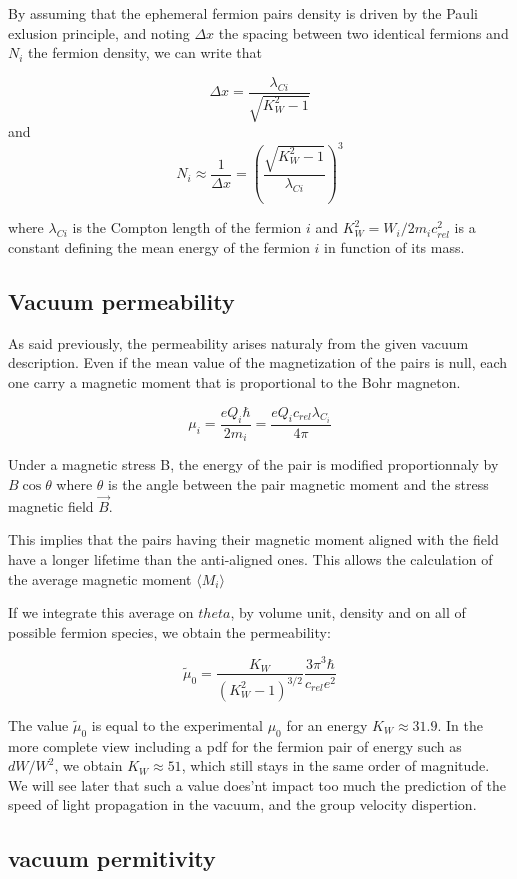 \documentclass[9pt, a4, twoside]{article}
\begin{document}
By assuming that the ephemeral fermion pairs density is driven by the Pauli exlusion principle, and noting $\Delta x$ the spacing between two identical fermions and $N_i$ the fermion density, we can write that

\[ \Delta x = \frac {\lambda _{Ci}} {\sqrt {K^2_W - 1}} \]
and
\[N_i \approx \frac {1} {\Delta x} = \left(\frac {\sqrt {K^2_W - 1}}{\lambda _{Ci}}\right)^3\]

where $\lambda _{Ci}$ is the Compton length of the fermion $i$ and $K^2_W = W_i / 2m_ic^2_{rel}$ is a constant defining the mean energy of the fermion $i$ in function of its mass.

\subsection {Vacuum permeability}
As said previously, the permeability arises naturaly from the given vacuum description. Even if the mean value of the magnetization of the pairs is null, each one carry a magnetic moment that is proportional to the Bohr magneton.

\[\mu_i = \frac {eQ_i\hbar} {2m_i} = \frac {eQ_ic_{rel}\lambda_{C_i}} {4\pi}\]

Under a magnetic stress B, the energy of the pair is modified proportionnaly by $B\cos\theta$ where $\theta$ is the angle between the pair magnetic moment and the stress magnetic field $\vec B$.

This implies that the pairs having their magnetic moment aligned with the field have a longer lifetime than the anti-aligned ones. This allows the calculation of the average magnetic moment $\langle M_i \rangle$

If we integrate this average on $theta$, by volume unit, density and on all of possible fermion species, we obtain the permeability:

\[ \tilde \mu_0 = \frac {K_W} { (K^2_W - 1)^{3/2}}\frac {3\pi^3\hbar}{c_{rel}e^2}\]

The value $\tilde \mu_0$ is equal to the experimental $\mu_0$ for an energy $K_W\approx 31.9$. In the more complete view including a pdf for the fermion pair of energy such as $dW/W^2$, we obtain $K_W\approx 51$, which still stays in the same order of magnitude. We will see later that such a value does'nt impact too much the prediction of the speed of light propagation in the vacuum, and the group velocity dispertion.

\subsection{vacuum permitivity}
\end{document}

